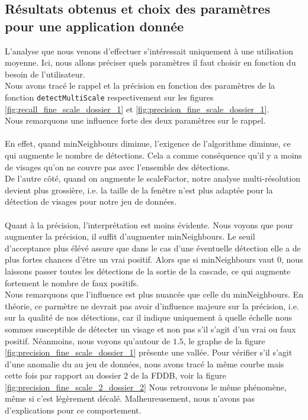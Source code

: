 \documentclass[a4paper,11pt]{article}
\begin{document}
        \subsection{Résultats obtenus et choix des paramètres pour une application donnée}

            L'analyse que nous venons d'effectuer s'intéressait uniquement à une utilisation moyenne. Ici, nous allons préciser quels paramètres il faut choisir en fonction du besoin de l'utilisateur.
            \\
            Nous avons tracé le rappel et la précision en fonction des paramètres de la fonction \verb!detectMultiScale! respectivement sur les figures \ref{fig:recall_fine_scale_dossier_1} et \ref{fig:precision_fine_scale_dossier_1}.
            \\
            Nous remarquons une influence forte des deux paramètres sur le rappel.
            \\
            \\
            En effet, quand minNeighbours diminue, l'exigence de l'algorithme diminue, ce qui augmente le nombre de détections.
            Cela a comme conséquence qu'il y a moins de visages qu'on ne couvre pas avec l'ensemble des détections.
            \\
            De l'autre côté, quand on augmente le scaleFactor, notre analyse multi-résolution devient plus grossière, i.e. la taille de la fenêtre n'est plus adaptée pour la détection de visages pour notre jeu de données.
            \\
            \\
            Quant à la précision, l'interprétation est moins évidente.
            Nous voyons que pour augmenter la précision, il suffit d'augmenter minNeighbours.
            Le seuil d'acceptance plus élévé assure que dans le cas d'une éventuelle détection elle a de plus fortes chances d'être un vrai positif.
            Alors que si minNeighbours vaut $0$, nous laissons passer toutes les détections de la sortie de la cascade, ce qui augmente fortement le nombre de faux positifs.
            \\
            Nous remarquons que l'influence est plus nuancée que celle du minNeighbours.
            En théorie, ce parmètre ne devrait pas avoir d'influence majeure sur la précision, i.e. sur la qualité de nos détections, car il indique uniquement à quelle échelle nous sommes susceptible de détecter un visage et non pas s'il s'agit d'un vrai ou faux positif.
            Néanmoins, nous voyons qu'autour de $1.5$, le graphe de la figure \ref{fig:precision_fine_scale_dossier_1} présente une vallée.
            Pour vérifier s'il s'agit d'une anomalie du au jeu de données, nous avons tracé la même courbe mais cette fois par rapport au dossier 2 de la FDDB, voir la figure \ref{fig:precision_fine_scale_2_dossier_2}
            Nous retrouvons le même phénomène, même si c'est légèrement décalé.
            Malheureusement, nous n'avons pas d'explications pour ce comportement.
\end{document}
